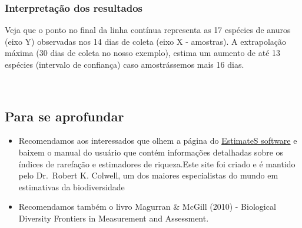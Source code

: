 \documentclass[
]{book}
\begin{document}
\hypertarget{interpretauxe7uxe3o-dos-resultados-9}{%
\subsubsection{Interpretação dos resultados}\label{interpretauxe7uxe3o-dos-resultados-9}}

Veja que o ponto no final da linha contínua representa as 17 espécies de anuros (eixo Y) observadas nos 14 dias de coleta (eixo X - amostras). A extrapolação máxima (30 dias de coleta no nosso exemplo), estima um aumento de até 13 espécies (intervalo de confiança) caso amostrássemos mais 16 dias.

~

\hypertarget{para-se-aprofundar-1}{%
\subsection{Para se aprofundar}\label{para-se-aprofundar-1}}

\begin{itemize}
\item
  Recomendamos aos interessados que olhem a página do \href{http://viceroy.eeb.uconn.edu/estimates}{EstimateS software} e baixem o manual do usuário que contém informações detalhadas sobre os índices de rarefação e estimadores de riqueza.Este site foi criado e é mantido pelo Dr.~Robert K. Colwell, um dos maiores especialistas do mundo em estimativas da biodiversidade
\item
  Recomendamos também o livro Magurran \& McGill (2010) - Biological Diversity Frontiers in Measurement and Assessment.
\end{itemize}

  
\end{document}
